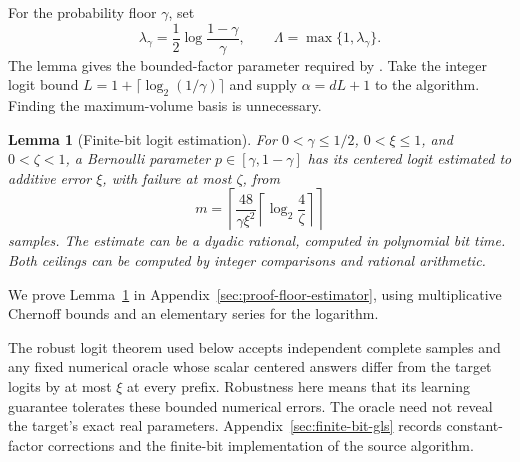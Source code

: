 \documentclass[11pt]{article}
\newtheorem{lemma}[theorem]{Lemma}
\theoremstyle{definition}
\theoremstyle{remark}
\begin{document}
For the probability floor $\gamma$, set
\[
\lambda_\gamma=\frac12\log\frac{1-\gamma}{\gamma},\qquad
\Lambda=\max\{1,\lambda_\gamma\}.
\]
The lemma gives the bounded-factor parameter required by \citet{gls2}. Take the integer logit bound $L=1+\lceil\log_2(1/\gamma)\rceil$ and supply $\alpha=dL+1$ to the algorithm. Finding the maximum-volume basis is unnecessary.

\begin{lemma}[Finite-bit logit estimation]\label{lem:floor-estimator}
For $0<\gamma\le1/2$, $0<\xi\le1$, and $0<\zeta<1$, a Bernoulli parameter $p\in[\gamma,1-\gamma]$ has its centered logit estimated to additive error $\xi$, with failure at most $\zeta$, from
\[
m=\left\lceil\frac{48}{\gamma\xi^2}
\left\lceil\log_2\frac4\zeta\right\rceil\right\rceil
\]
samples. The estimate can be a dyadic rational, computed in polynomial bit time.
Both ceilings can be computed by integer comparisons and rational arithmetic.
\end{lemma}
We prove Lemma~\ref{lem:floor-estimator} in Appendix~\ref{sec:proof-floor-estimator}, using multiplicative Chernoff bounds and an elementary series for the logarithm.

The robust logit theorem used below accepts independent complete samples and any fixed numerical oracle whose scalar centered answers differ from the target logits by at most $\xi$ at every prefix. Robustness here means that its learning guarantee tolerates these bounded numerical errors. The oracle need not reveal the target's exact real parameters. Appendix~\ref{sec:finite-bit-gls} records constant-factor corrections and the finite-bit implementation of the source algorithm.
\end{document}
